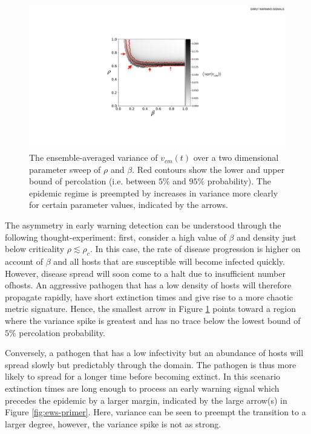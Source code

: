  \begin{figure}
    \centering
    \includegraphics[scale=0.45]{chapter3/figures/figure11.pdf}
    \caption{The ensemble-averaged variance of $v_{cm}(t)$ over a two dimensional parameter sweep of $\rho$ and $\beta$. Red contours show the lower and upper bound of percolation (i.e. between $5\%$ and $95\%$ probability). 
     The epidemic regime is preempted by increases in variance more clearly for certain parameter values, %
     indicated by the arrows.}
    \label{fig:ews-results} 
\end{figure}


The asymmetry in early warning detection can be understood through the following thought-experiment: %
first, consider a high value of $\beta$ and density just below criticality $\rho\lesssim\rho_c$. %
In this case, the rate of disease progression is higher on account of $\beta$ and all hosts %
that are susceptible will become infected quickly. %
However, disease spread will soon come to a halt due to insufficient number ofhosts. %
An aggressive pathogen that has a low density of hosts will therefore propagate rapidly, %
have short extinction times and give rise to a more chaotic metric signature. %
Hence, the smallest arrow in Figure \ref{fig:ews-results} points toward a region where the %
variance spike is greatest and has no trace below the lowest bound of $5\%$ percolation probability. %

Conversely, a pathogen that has a low infectivity but an abundance of hosts will spread %
slowly but predictably through the domain. The pathogen is thus more likely to spread for a longer time before becoming extinct. In this scenario extinction times are long enough to process an early warning signal which precedes the epidemic by a larger margin, indicated by the large arrow(s) in Figure \ref{fig:ews-primer}. Here, variance can be seen to preempt the transition to a larger degree, however, the variance spike is not as strong.
 
